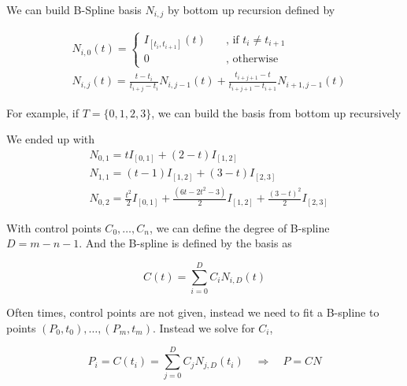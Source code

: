 \documentclass[UTF8]{ctexart}
\begin{document}
We can build B-Spline basis $N_{i, j}$ by bottom up recursion defined by 
\begin{Large}
$$
\begin{aligned}
&N_{i, 0}(t) = \begin{cases}
	I_{\left[t_i, t_{i+1}\right]}(t) &\quad\text{, if } t_i \neq t_{i+1} \\
	0 &\quad\text{, otherwise}
\end{cases} \\
&N_{i, j}(t) = \frac{t - t_i}{t_{i+j} - t_{i}} N_{i, j-1}(t) + \frac{t_{i+j+1} - t}{t_{i+j+1} - t_{i+1}} N_{i+1, j-1}(t)
\end{aligned}
$$

\begin{tcolorbox}[colback=white,colframe=cyan,width=\dimexpr\textwidth+12mm\relax,enlarge left by=-6mm]
For example, if $T=\{0, 1, 2, 3\}$, we can build the basis from bottom up recursively
\begin{center}
\end{center}

We ended up with 
$$
 \begin{aligned}
 	&N_{0, 1} =  t I_{\left[0, 1\right]} + (2 - t) I_{\left[1, 2\right]} \\ 
 	&N_{1, 1} =  (t - 1) I_{\left[1, 2\right]} + (3 - t) I_{\left[2, 3\right]} \\
 	&N_{0, 2} = \frac{t^2}{2} I_{\left[0, 1\right]} + \frac{(6t - 2t^2 -3)}{2} I_{\left[1, 2\right]} + \frac{(3 - t)^2}{2}  I_{\left[2, 3\right]}
 \end{aligned}
$$

\end{tcolorbox}

With control points $C_0, \ldots, C_n$, we can define the degree of B-spline $D = m - n - 1$. And the B-spline is defined by the basis as 

$$ C(t) = \sum_{i = 0}^{D} C_i N_{i, D}(t) $$

Often times, control points are not given, instead we need to fit a B-spline to points $(P_0, t_0), \ldots , (P_m, t_m)$. Instead we solve for $C_i$, 

$$ P_i = C(t_i) = \sum_{j = 0}^{D} C_j N_{j, D}(t_i) \quad  \Rightarrow  \quad P = C N $$

\end{Large}
\end{document}

